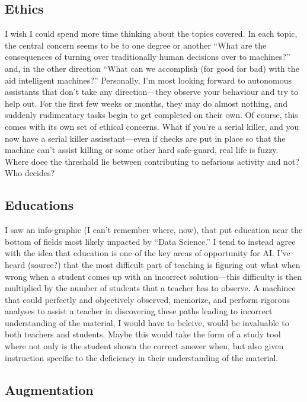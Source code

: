 \documentclass[11pt]{article}  %
\begin{document}
\begin{enumerate}
\begin{enumerate}
    \subsection{Ethics}
    I wish I could spend more time thinking about the topics covered.  In each
    topic, the central concern seems to be to one degree or another ``What are
    the consequences of turning over traditionally human decisions over to
    machines?'' and, in the other direction ``What can we
    accomplish (for good for bad) with the aid intelligent machines?'' 
    Personally, I'm most looking forward to autonomous assistants that don't
    take any direction---they observe your behaviour and try to help out.  For
    the first few weeks or months, they may do almost nothing, and suddenly
    rudimentary tasks begin to get completed on their own.  Of course, this
    comes with its own set of ethical concerns.  What if you're a serial killer,
    and you now have a serial killer assisstant---even if checks are put in
    place so that the machine can't assist killing or some other hard safe-guard, 
    real life is fuzzy.  Where doee the threshold lie between contributing to 
    nefarious activity and not?  Who decides?   

    \subsection{Educations}    
    I saw an info-graphic (I can't remember where, now), that put education near
    the bottom of fields most likely impacted by ``Data Science.''  I
    tend to instead agree with the idea that education is one of the key areas
    of opportunity for AI.  I've heard (source?) that the most difficult part of
    teaching is figuring out what when wrong when a student comes up with an incorrect
    solution---this difficulty is then multiplied by the number of students that
    a teacher has to observe.  A machince that could perfectly and
    objectively observed, memorize, and perform rigorous analyses to assist a
    teacher in discovering these paths leading to incorrect understanding of
    the material, I would have to beleive, would be invaluable to both teachers
    and students.  Maybe this would take the form of a study tool where not only
    is the student shown the correct answer when, but also given instruction
    specific to the deficiency in their understanding of the material.
    
   
    
    \subsection{Augmentation}
    

\end{enumerate}
\end{enumerate}
\end{document}
